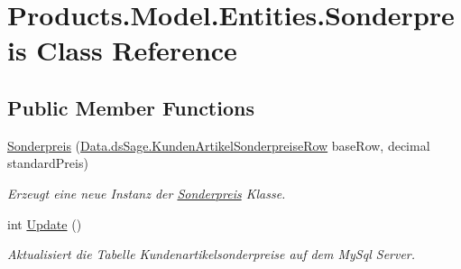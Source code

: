 \hypertarget{class_products_1_1_model_1_1_entities_1_1_sonderpreis}{}\section{Products.\+Model.\+Entities.\+Sonderpreis Class Reference}
\label{class_products_1_1_model_1_1_entities_1_1_sonderpreis}
\subsection*{Public Member Functions}
\begin{DoxyCompactItemize}
\item 
\hyperlink{class_products_1_1_model_1_1_entities_1_1_sonderpreis_a019f10a3fed9ca9fa961991725c40c85}{Sonderpreis} (\hyperlink{class_products_1_1_data_1_1ds_sage_1_1_kunden_artikel_sonderpreise_row}{Data.\+ds\+Sage.\+Kunden\+Artikel\+Sonderpreise\+Row} base\+Row, decimal standard\+Preis)
\begin{DoxyCompactList}\small\item\em Erzeugt eine neue Instanz der \hyperlink{class_products_1_1_model_1_1_entities_1_1_sonderpreis}{Sonderpreis} Klasse. \end{DoxyCompactList}\item 
int \hyperlink{class_products_1_1_model_1_1_entities_1_1_sonderpreis_a0e1f620c07d016f4cae99fc423602044}{Update} ()
\begin{DoxyCompactList}\small\item\em Aktualisiert die Tabelle Kundenartikelsonderpreise auf dem My\+Sql Server. \end{DoxyCompactList}\end{DoxyCompactItemize}
